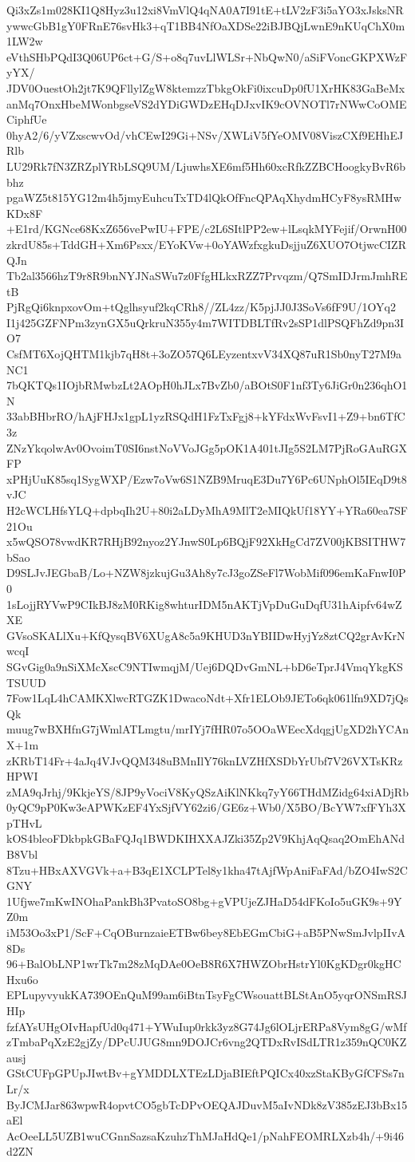 Qi3xZs1m028KI1Q8Hyz3u12xi8VmVlQ4qNA0A7I91tE+tLV2zF3i5aYO3xJsksNR
ywwcGbB1gY0FRnE76svHk3+qT1BB4NfOaXDSe22iBJBQjLwnE9nKUqChX0m1LW2w
eVthSHbPQdI3Q06UP6ct+G/S+o8q7uvLlWLSr+NbQwN0/aSiFVoncGKPXWzFyYX/
JDV0OuestOh2jt7K9QFllylZgW8ktemzzTbkgOkFi0ixcuDp0fU1XrHK83GaBeMx
anMq7OnxHbeMWonbgseVS2dYDiGWDzEHqDJxvIK9cOVNOTl7rNWwCoOMECiphfUe
0hyA2/6/yVZxscwvOd/vhCEwI29Gi+NSv/XWLiV5fYeOMV08ViszCXf9EHhEJRlb
LU29Rk7fN3ZRZplYRbLSQ9UM/LjuwhsXE6mf5Hh60xcRfkZZBCHoogkyBvR6bbhz
pgaWZ5t815YG12m4h5jmyEuhcuTxTD4lQkOfFncQPAqXhydmHCyF8ysRMHwKDx8F
+E1rd/KGNce68KxZ656vePwIU+FPE/c2L6SItlPP2ew+lLsqkMYFejif/OrwnH00
zkrdU85s+TddGH+Xm6Psxx/EYoKVw+0oYAWzfxgkuDsjjuZ6XUO7OtjwcCIZRQJn
Tb2al3566hzT9r8R9bnNYJNaSWu7z0FfgHLkxRZZ7Prvqzm/Q7SmIDJrmJmhREtB
PjRgQi6knpxovOm+tQglhsyuf2kqCRh8//ZL4zz/K5pjJJ0J3SoVs6fF9U/1OYq2
I1j425GZFNPm3zynGX5uQrkruN355y4m7WITDBLTfRv2sSP1dlPSQFhZd9pn3IO7
CsfMT6XojQHTM1kjb7qH8t+3oZO57Q6LEyzentxvV34XQ87uR1Sb0nyT27M9aNC1
7bQKTQs1IOjbRMwbzLt2AOpH0hJLx7BvZb0/aBOtS0F1nf3Ty6JiGr0n236qhO1N
33abBHbrRO/hAjFHJx1gpL1yzRSQdH1FzTxFgj8+kYFdxWvFsvI1+Z9+bn6TfC3z
ZNzYkqolwAv0OvoimT0SI6nstNoVVoJGg5pOK1A401tJIg5S2LM7PjRoGAuRGXFP
xPHjUuK85sq1SygWXP/Ezw7oVw6S1NZB9MruqE3Du7Y6Pc6UNphOl5IEqD9t8vJC
H2cWCLHfsYLQ+dpbqIh2U+80i2aLDyMhA9MlT2eMIQkUf18YY+YRa60ea7SF21Ou
x5wQSO78vwdKR7RHjB92nyoz2YJnwS0Lp6BQjF92XkHgCd7ZV00jKBSITHW7bSao
D9SLJvJEGbaB/Lo+NZW8jzkujGu3Ah8y7cJ3goZSeFl7WobMif096emKaFnwI0P0
1sLojjRYVwP9CIkBJ8zM0RKig8whturIDM5nAKTjVpDuGuDqfU31hAipfv64wZXE
GVsoSKALlXu+KfQysqBV6XUgA8c5a9KHUD3nYBIIDwHyjYz8ztCQ2grAvKrNwcqI
SGvGig0a9nSiXMcXscC9NTIwmqjM/Uej6DQDvGmNL+bD6eTprJ4VmqYkgKSTSUUD
7Fow1LqL4hCAMKXlwcRTGZK1DwacoNdt+Xfr1ELOb9JETo6qk061lfn9XD7jQsQk
muug7wBXHfnG7jWmlATLmgtu/mrIYj7fHR07o5OOaWEecXdqgjUgXD2hYCAnX+1m
zKRbT14Fr+4aJq4VJvQQM348uBMnIlY76knLVZHfXSDbYrUbf7V26VXTsKRzHPWI
zMA9qJrhj/9KkjeYS/8JP9yVociV8KyQSzAiKlNKkq7yY66THdMZidg64xiADjRb
0yQC9pP0Kw3eAPWKzEF4YxSjfVY62zi6/GE6z+Wb0/X5BO/BcYW7xfFYh3XpTHvL
kOS4bleoFDkbpkGBaFQJq1BWDKIHXXAJZki35Zp2V9KhjAqQsaq2OmEhANdB8Vbl
8Tzu+HBxAXVGVk+a+B3qE1XCLPTel8y1kha47tAjfWpAniFaFAd/bZO4IwS2CGNY
1Ufjwe7mKwINOhaPankBh3PvatoSO8bg+gVPUjeZJHaD54dFKoIo5uGK9s+9YZ0m
iM53Oo3xP1/ScF+CqOBurnzaieETBw6bey8EbEGmCbiG+aB5PNwSmJvlpIIvA8Ds
96+BalObLNP1wrTk7m28zMqDAe0OeB8R6X7HWZObrHstrYl0KgKDgr0kgHCHxu6o
EPLupyvyukKA739OEnQuM99am6iBtnTsyFgCWsouattBLStAnO5yqrONSmRSJHIp
fzfAYsUHgOIvHapfUd0q471+YWuIup0rkk3yz8G74Jg6lOLjrERPa8Vym8gG/wMf
zTmbaPqXzE2gjZy/DPcUJUG8mn9DOJCr6vng2QTDxRvISdLTR1z359nQC0KZausj
GStCUFpGPUpJIwtBv+gYMDDLXTEzLDjaBIEftPQICx40xzStaKByGfCFSs7nLr/x
ByJCMJar863wpwR4opvtCO5gbTcDPvOEQAJDuvM5aIvNDk8zV385zEJ3bBx15aEl
AcOeeLL5UZB1wuCGnnSazsaKzuhzThMJaHdQe1/pNahFEOMRLXzb4h/+9i46d2ZN
